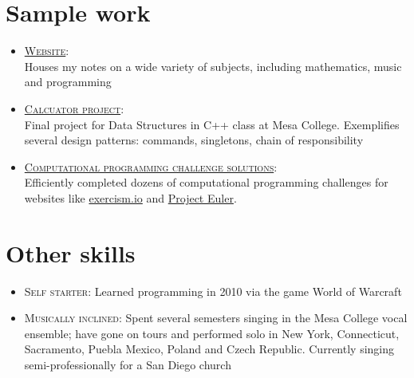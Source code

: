 \documentclass[10pt, letterpaper]{article}
\def\username{nilsso}
\begin{document}
\section{Sample work}
\begin{footnotesize}
  \begin{itemize}
    \item
      \textsc{\href{https://\username.github.io}{Website}:}\\
      Houses my notes on a wide variety of subjects, including mathematics, music and programming

    \item
      \textsc{\href{https://github.com/\username/ACalculator}{Calcuator project}:}\\
      Final project for Data Structures in C++ class at Mesa
      College. Exemplifies several design patterns: commands, singletons, chain
      of responsibility

    \item
      \textsc{\href{https://github.com/\username/challenge-solutions}{Computational programming challenge solutions}:}\\
      Efficiently completed dozens of computational programming challenges for websites like
      \href{https://exercism.io}{exercism.io} and
      \href{https://projecteuler.net}{Project Euler}.
  \end{itemize}
\end{footnotesize}

\section{Other skills}
\begin{footnotesize}
  \begin{itemize}
    \item
      \textsc{Self starter:}
      Learned programming in 2010 via the game World of Warcraft

    \item
      \textsc{Musically inclined:}
      Spent several semesters singing in the Mesa College vocal ensemble; have
      gone on tours and performed solo in New York, Connecticut, Sacramento,
      Puebla Mexico, Poland and Czech Republic. Currently singing
      semi-professionally for a San Diego church
  \end{itemize}
\end{footnotesize}
\end{document}
